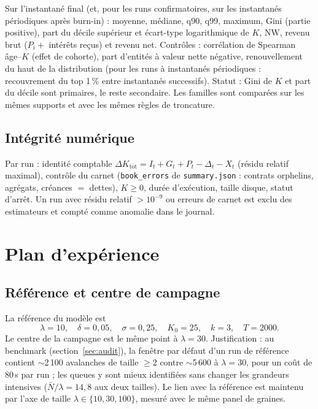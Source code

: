 \documentclass[11pt,a4paper]{article}
\newcommand{\code}[1]{\texttt{#1}}
\newcommand{\NW}{\mathrm{NW}}
\begin{document}
Sur l'instantané final (et, pour les runs confirmatoires, sur les
instantanés périodiques après burn-in) : moyenne, médiane, q90, q99,
maximum, Gini (partie positive), part du décile supérieur et écart-type
logarithmique de $K$, $\NW$, revenu brut ($P_i + $ intérêts reçus) et
revenu net. Contrôles : corrélation de Spearman âge--$K$ (effet de
cohorte), part d'entités à valeur nette négative, renouvellement du haut de
la distribution (pour les runs à instantanés périodiques : recouvrement du
top 1\,\% entre instantanés successifs). Statut : Gini de $K$ et part du
décile sont primaires, le reste secondaire. Les familles sont comparées sur
les mêmes supports et avec les mêmes règles de troncature.

\subsection{Intégrité numérique}

Par run : identité comptable
$\Delta K_{\mathrm{tot}} = I_t + G_t + P_t - \Delta_t - X_t$ (résidu
relatif maximal), contrôle du carnet (\code{book\_errors} de
\code{summary.json} : contrats orphelins, agrégats, créances $=$ dettes),
$K\ge0$, durée d'exécution, taille disque, statut d'arrêt. Un run avec
résidu relatif $>10^{-9}$ ou erreurs de carnet est exclu des estimateurs et
compté comme anomalie dans le journal.

\section{Plan d'expérience}
\label{sec:plan}

\subsection{Référence et centre de campagne}

La référence du modèle est
\[
\lambda=10,\quad \delta=0{,}05,\quad \sigma=0{,}25,\quad K_0=25,\quad
k=3,\quad T=2000 .
\]
Le centre de la campagne est le même point à $\lambda=30$. Justification :
au benchmark (section~\ref{sec:audit}), la fenêtre par défaut d'un run de
référence contient $\sim$2\,100 avalanches de taille $\ge2$ contre
$\sim$5\,600 à $\lambda=30$, pour un coût de 80\,s par run ; les queues y
sont mieux identifiées sans changer les grandeurs intensives
($\bar N/\lambda = 14{,}8$ aux deux tailles). Le lien avec la référence est
maintenu par l'axe de taille $\lambda\in\{10,30,100\}$, mesuré avec le
même panel de graines.
\end{document}

